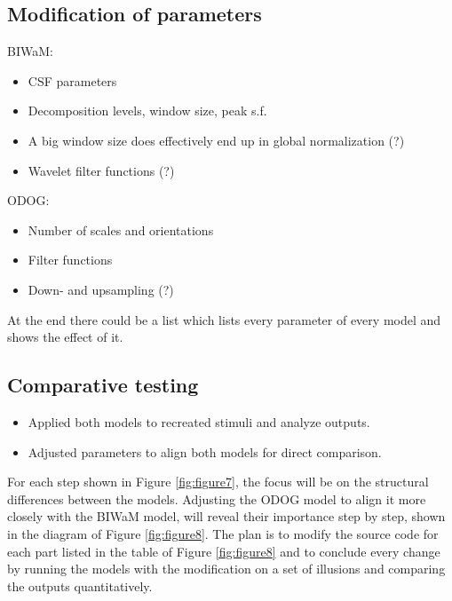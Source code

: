 \subsection*{Modification of parameters}
BIWaM:
\begin{itemize} 
    \item CSF parameters
    \item Decomposition levels, window size, peak s.f.
    \item A big window size does effectively end up in global normalization (?)
    \item Wavelet filter functions (?)
\end{itemize}
ODOG:
\begin{itemize} 
    \item Number of scales and orientations 
    \item Filter functions
    \item Down- and upsampling (?)
\end{itemize}

At the end there could be a list which lists every parameter of every model and shows the
effect of it.

\subsection*{Comparative testing}
\begin{itemize}
    \item Applied both models to recreated stimuli and analyze outputs.
    \item Adjusted parameters to align both models for direct comparison.
\end{itemize}

\newpage

For each step shown in Figure \ref{fig:figure7}, the focus will be on the structural
differences between the models. Adjusting the ODOG model to align it more closely with the
BIWaM model, will reveal their importance step by step, shown in the diagram of Figure
\ref{fig:figure8}. The plan is to modify the source code for each part listed in the table
of Figure \ref*{fig:figure8} and to conclude every change by running the models with the
modification on a set of illusions and comparing the outputs quantitatively.


